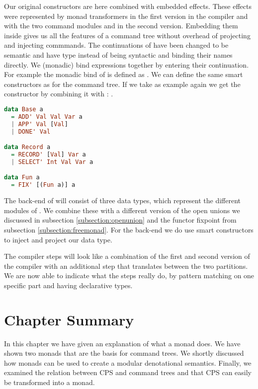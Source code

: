 Our original constructors are here combined with embedded effects. These effects were represented by monad transformers in the first version in the compiler and with the two command modules  and  in the second version. Embedding them inside gives us all the features of a command tree without overhead of projecting and injecting commmands. The continuations of  have been changed to be semantic and have type  instead of being syntactic and binding their names directly. We (monadic) bind expressions together by entering their continuation. For example the monadic bind of  is defined as . We can define the same smart constructors as for the command tree. If we take  as example again we get the constructor by combining it with : .

\begin{lstlisting}[language=Haskell]
data Base a
  = ADD' Val Val Var a
  | APP' Val [Val]
  | DONE' Val

data Record a
  = RECORD' [Val] Var a
  | SELECT' Int Val Var a

data Fun a
  = FIX' [(Fun a)] a
\end{lstlisting}

The back-end of will consist of three data types, which represent the different modules of . We combine these with a different version of the open unions we discussed in subsection \ref{subsection:openunion} and the functor fixpoint  from subsection \ref{subsection:freemonad}. For the back-end we do use smart constructors to inject and project our data type.

The compiler steps will look like a combination of the first and second version of the compiler with an additional step that translates between the two  partitions. We are now able to indicate what the steps really do, by pattern matching on one specific part and having declarative types.

\section{Chapter Summary}
In this chapter we have given an explanation of what a monad does. We have shown two monads that are the basis for command trees. We shortly discussed how monads can be used to create a modular denotational semantics. Finally, we examined the relation between CPS and command trees and that CPS can easily be transformed into a monad.